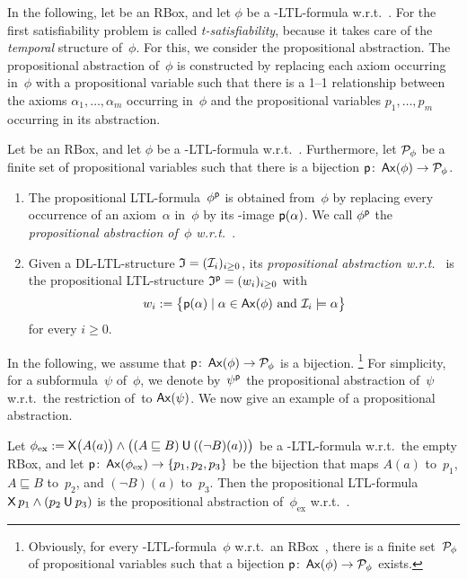 In the following, let \Rmc be an RBox, and let $\phi$ be a \SHOQ-LTL-formula
w.r.t.~\Rmc.
%
For the first satisfiability problem is called \emph{t-satisfiability}, because
it takes care of the \emph{temporal} structure of~$\phi$.  For this, we consider
the propositional abstraction.  The propositional abstraction of~$\phi$ is
constructed by replacing each axiom occurring in~$\phi$
with a propositional variable such that there is a 1--1 relationship between the
axioms $\alpha_1,\dots,\alpha_m$ occurring in~$\phi$ and the propositional
variables $p_1,\dots,p_m$ occurring in its abstraction.

\begin{definition}\label{def:prop-abs}
    Let \Rmc be an RBox, and let $\phi$ be a \SHOQ-LTL-formula w.r.t.~\Rmc.
    Furthermore, let $\mathcal{P}_\phi$ be a finite set of propositional variables such
    that there is a bijection $\mathsf{p}\colon\operatorname{\mathsf{Ax}}(\phi)\to\mathcal{P}_\phi$.
    \begin{enumerate}
        \item The propositional LTL-formula~$\phi^\mathsf{p}$ is obtained from~$\phi$
            by replacing every occurrence of an axiom~$\alpha$ in~$\phi$ by its
            \psf-image $\mathsf{p}(\alpha)$.  We call $\phi^\mathsf{p}$ the
            \emph{propositional abstraction of~$\phi$ w.r.t.~\psf}.
        \item Given a DL-LTL-structure $\mathfrak{I}=(\mathcal{I}_i)_{i\ge 0}$, its
            \emph{propositional abstraction w.r.t.~\psf} is the propositional
            LTL-structure $\mathfrak{I}^\mathsf{p}=(w_i)_{i\ge 0}$ with
            \[w_i:=\bigl\{\psf(\alpha)\mid\alpha\in\Ax(\phi)\ \text{and} \
                \Imc_i\models\alpha\bigr\}\]
            for every $i\ge 0$.
    \end{enumerate}
\end{definition}

\noindent
In the following, we assume that $\mathsf{p}\colon\operatorname{\mathsf{Ax}}(\phi)\to\mathcal{P}_\phi$ is a
bijection.%
\footnote{Obviously, for every \SHOQ-LTL-formula~$\phi$ w.r.t.\ an RBox~\Rmc,
    there is a finite set~$\mathcal{P}_\phi$ of propositional variables such that a
    bijection $\mathsf{p}\colon\operatorname{\mathsf{Ax}}(\phi)\to\mathcal{P}_\phi$ exists.}
%
For simplicity, for a subformula~$\psi$ of~$\phi$, we denote by~$\psi^\mathsf{p}$ the
propositional abstraction of~$\psi$ w.r.t.\ the restriction of~\psf to
$\operatorname{\mathsf{Ax}}(\psi)$.
%
We now give an example of a propositional abstraction.

\begin{example}\label{ex:prop-abs}
    Let
    $\phi_\text{ex}:=\operatorname{\mathsf{X}}\bigl(A(a)\bigr)\land\bigl((A\sqsubseteq B)\mathbin{\mathsf{U}}((\lnot B)(a))\bigr)$
    be a \SHOQ-LTL-formula w.r.t.\ the empty RBox, and let
    $\mathsf{p}\colon\operatorname{\mathsf{Ax}}(\phi_\text{ex})\to\{p_1,p_2,p_3\}$ be the bijection that maps
    $A(a)$ to~$p_1$, $A\sqsubseteq B$ to~$p_2$, and $(\lnot B)(a)$ to~$p_3$.
    Then the propositional LTL-formula $\operatorname{\mathsf{X}} p_1\land(p_2\mathbin{\mathsf{U}} p_3)$ is the
    propositional abstraction of~$\phi_\text{ex}$ w.r.t.~\psf.
\end{example}


